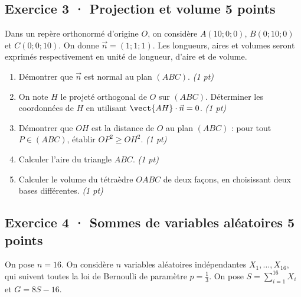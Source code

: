 \clearpage{}\par

\subsection*{Exercice 3 · Projection et volume \hfill 5 points}Dans un repère orthonormé d'origine $O$, on considère $A(10;0;0)$, $B(0;10;0)$ et $C(0;0;10)$. On donne $\vec n=(1;1;1)$. Les longueurs, aires et volumes seront exprimés respectivement en unité de longueur, d'aire et de volume.

\begin{enumerate}

\item Démontrer que $\vec n$ est normal au plan $(ABC)$. \hfill\textit{(1 pt)}

\item On note $H$ le projeté orthogonal de $O$ sur $(ABC)$. Déterminer les coordonnées de $H$ en utilisant $\vect{AH}\cdot\vec n=0$. \hfill\textit{(1 pt)}

\item Démontrer que $OH$ est la distance de $O$ au plan $(ABC)$ : pour tout $P\in(ABC)$, établir $OP^2\ge OH^2$. \hfill\textit{(1 pt)}

\item Calculer l'aire du triangle $ABC$. \hfill\textit{(1 pt)}

\item Calculer le volume du tétraèdre $OABC$ de deux façons, en choisissant deux bases différentes. \hfill\textit{(1 pt)}

\end{enumerate}

\subsection*{Exercice 4 · Sommes de variables aléatoires \hfill 5 points}On pose $n=16$. On considère $n$ variables aléatoires indépendantes $X_1,\ldots,X_{16}$, qui suivent toutes la loi de Bernoulli de paramètre $p=\frac{1}{3}$. On pose $S=\displaystyle\sum_{i=1}^{16}X_i$ et $G=8S-16$.

